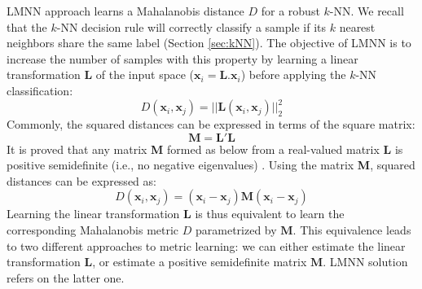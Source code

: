 LMNN approach learns a Mahalanobis distance $D$ for a robust $k$-NN. We recall that the $k$-NN decision rule will correctly classify a sample if its $k$ nearest neighbors share the same label (Section \ref{sec:kNN}). 
The objective of LMNN is to increase the number of samples with this property by learning a linear transformation $\textbf{L}$ of the input space ($\textbf{x}_i=\textbf{L}.\textbf{x}_i$) before applying the $k$-NN classification:
\begin{equation}
	D(\textbf{x}_i,\textbf{x}_j) = ||\textbf{L}(\textbf{x}_i,\textbf{x}_j)||_2^2
	\label{eq:lin}
\end{equation}
\noindent Commonly, the squared distances can be expressed in terms of the square matrix:
\begin{equation}
\textbf{M} = \textbf{L}'\textbf{L}
\end{equation}
It is proved that any matrix \textbf{M} formed as below from a real-valued matrix \textbf{L} is positive semidefinite (i.e., no negative eigenvalues) \cite{Weinberger2009}. Using the matrix \textbf{M}, squared distances can be expressed as:
\begin{equation}
D(\textbf{x}_i,\textbf{x}_j) = (\textbf{x}_i-\textbf{x}_j)\textbf{M}(\textbf{x}_i-\textbf{x}_j)
\end{equation}
Learning the linear transformation $\textbf{L}$ is thus equivalent to learn the corresponding Mahalanobis metric $D$ parametrized by $\textbf{M}$. This equivalence leads to two different approaches to metric learning: we can either estimate the linear transformation $\textbf{L}$, or estimate a positive semidefinite matrix $\textbf{M}$. LMNN solution refers on the latter one.




